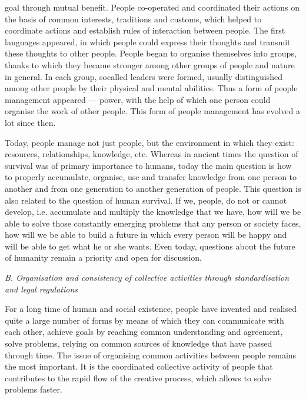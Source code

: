 \documentclass[a4paper]{article}
\begin{document}
\setlength\parindent{11pt}
\fontsize{9.7}{13}\selectfont

\begin{multicols}{2}

{\setlength{\parindent}{0pt} %
 \nohyphens{
goal through mutual benefit. People co-operated and coordinated their actions on the basis of common interests,
traditions and customs, which helped to coordinate actions and establish rules of interaction between people.
The first languages appeared, in which people could express their thoughts and transmit these thoughts to other
people. People began to organise themselves into groups,
thanks to which they became stronger among other
groups of people and nature in general. In each group, socalled leaders were formed, usually distinguished among
other people by their physical and mental abilities. Thus
a form of people management appeared — power, with
the help of which one person could organise the work
of other people. This form of people management has
evolved a lot since then.}}

{\fontsize{9.5}{13}\selectfont Today, people manage not just people, but the environment in which they exist: resources, relationships,
knowledge, etc. Whereas in ancient times the question of
survival was of primary importance to humans, today the
main question is how to properly accumulate, organise,
use and transfer knowledge from one person to another
and from one generation to another generation of people.
This question is also related to the question of human
survival. If we, people, do not or cannot develop, i.e.
accumulate and multiply the knowledge that we have,
how will we be able to solve those constantly emerging
problems that any person or society faces, how will we
be able to build a future in which every person will be
happy and will be able to get what he or she wants. Even
today, questions about the future of humanity remain a
priority and open for discussion.
\par}

\vspace{1.0mm}

{\setlength{\parindent}{0pt}\nohyphens{\textit{B. Organisation and consistency of collective activities through standardisation and legal regulations }}} \par

\vspace{0.5mm}

{\fontsize{9.5}{13}\selectfont For a long time of human and social existence, people
have invented and realised quite a large number of forms
by means of which they can communicate with each
other, achieve goals by reaching common understanding
and agreement, solve problems, relying on common
sources of knowledge that have passed through time. The
issue of organising common activities between people remains the most important. It is the coordinated collective
activity of people that contributes to the rapid flow of the
creative process, which allows to solve problems faster.\par}


\end{multicols}
\end{document}
